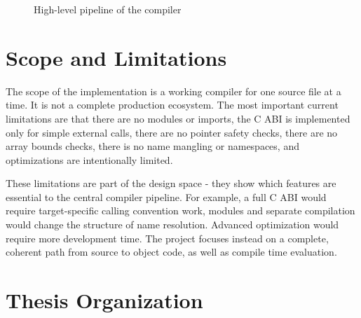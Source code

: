 \begin{figure}[H]
  \centering
  \caption{High-level pipeline of the \epl{} compiler}
  \label{fig:pipeline}
\end{figure}

\section{Scope and Limitations}

The scope of the implementation is a working compiler for one source file at
a time. It is not a complete production ecosystem. The most important current
limitations are that there are no modules or imports, the C ABI is implemented
only for simple external calls, there are no pointer safety checks, there are no
array bounds checks, there is no name mangling or namespaces, and optimizations
are intentionally limited.

These limitations are part of the design space - they show which features
are essential to the central compiler pipeline. For example, a full C ABI
would require target-specific calling convention work, modules and separate
compilation would change the structure of name resolution. Advanced optimization
would require more development time. The project focuses instead on a complete,
coherent path from source to object code, as well as compile time evaluation.

\section{Thesis Organization}

